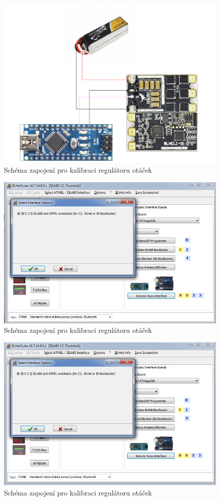 \begin{figure}[h]
	\centering
	\includegraphics[width=12cm]{pictures/esc_calib.pdf}
	\caption{Schéma zapojení pro kalibraci regulátoru otáček}
\end{figure}

\begin{figure}[h]
	\centering
	\includegraphics[width=12cm]{pictures/esc_calib1.jpg}
	\caption{Schéma zapojení pro kalibraci regulátoru otáček}
\end{figure}

\begin{figure}[h]
	\centering
	\includegraphics[width=12cm]{pictures/esc_calib2.jpg}
	\caption{Schéma zapojení pro kalibraci regulátoru otáček}
\end{figure}


